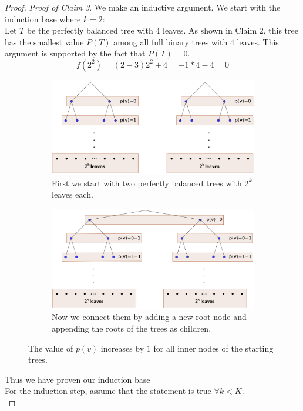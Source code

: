 \begin{proof}
\textit{Proof of Claim 3}. We make an inductive argument.
We start with the induction base where $k =2$:\\
Let $T$ be the perfectly balanced tree with $4$ leaves. As shown in Claim 2, this tree has the smallest value $P(T)$ among all full binary trees with $4$ leaves. This argument is supported by the fact that $P(T)=0$.
$$f(2^2)= (2-3)2^2 +4 = -1*4 - 4 = 0$$
\begin{figure}\label{fig:build2K}
    \begin{subfigure}[b]{0.8\textwidth}
        \includegraphics[width=\textwidth]{figures/2k_construction1.png}
        \caption{First we start with two perfectly balanced trees with $2^k$ leaves each.}
    \end{subfigure}
    \quad
    \begin{subfigure}[b]{0.8\textwidth}
        \includegraphics[width=\textwidth]{figures/2k_construction2.png}
        \caption{Now we connect them by adding a new root node and appending the roots of the trees as children.}
    \end{subfigure}
    \caption{The value of $p(v)$ increases by $1$ for all inner nodes of the starting trees. }
\end{figure}
Thus we have proven our induction base\\
For the induction step, assume that the statement is true $\forall k < K$.\\

\end{proof}
